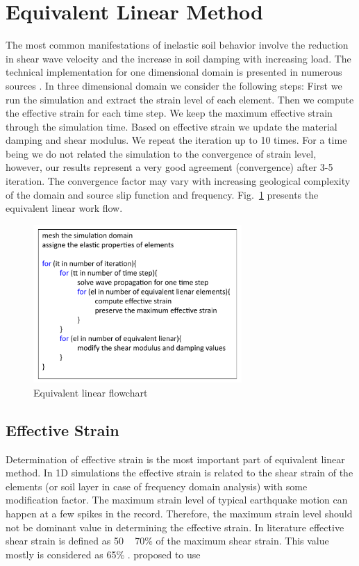 
\section{Equivalent Linear Method}

The most common manifestations of inelastic soil behavior involve the reduction in shear wave velocity and the increase in soil damping with increasing load. The technical implementation for one dimensional domain is presented in numerous sources \citep[e.g.,][]{Kramer1996geotechnical}. In three dimensional domain we consider the following steps: First we run the simulation and extract the strain level of each element. Then we compute the effective strain for each time step. We keep the maximum effective strain through the simulation time. Based on effective strain we update the material damping and shear modulus. We repeat the iteration up to 10 times. For a time being we do not related the simulation to the convergence of strain level, however, our results represent a very good agreement (convergence) after 3-5 iteration. The convergence factor may vary with increasing geological complexity of the domain and source slip function and frequency. Fig.~\ref{fig:equivalent_linear_flowchart} presents the equivalent linear work flow. 

\begin{figure}
    \centering
    \includegraphics[width=300px]{figures/pdf/equivalent_linear_flowchart.pdf}
    \caption{Equivalent linear flowchart}
    \label{fig:equivalent_linear_flowchart}
\end{figure}


\subsection{Effective Strain}

Determination of effective strain is the most important part of equivalent linear method. In 1D simulations the effective strain is related to the shear strain of the elements (or soil layer in case of frequency domain analysis) with some modification factor. The maximum strain level of typical earthquake motion can happen at a few spikes in the record. Therefore, the maximum strain level should not be dominant value in determining the effective strain. In literature effective shear strain is defined as 50 ~ 70\% of the maximum shear strain. This value mostly is considered as 65\% \citep{Kramer1996geotechnical}.  \citet{Idriss1992} proposed to use 

